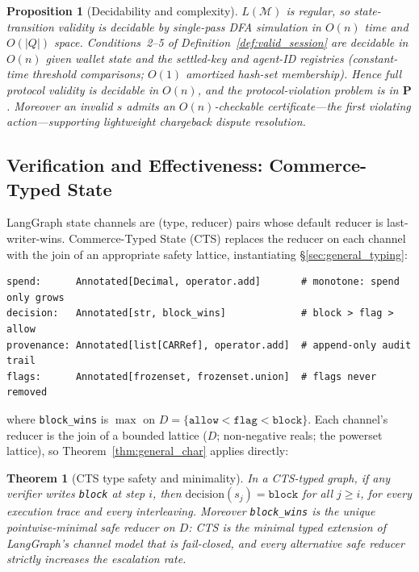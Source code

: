 \documentclass{article}
\newtheorem{proposition}{Proposition}
\newtheorem{theorem}{Theorem}
\begin{document}
\begin{proposition}[Decidability and complexity]
\label{prop:decidability}
$L(\mathcal{M})$ is regular, so state-transition validity is decidable by single-pass DFA
simulation in $O(n)$ time and $O(|Q|)$ space. Conditions~2--5 of
Definition~\ref{def:valid_session} are decidable in $O(n)$ given wallet state and the
settled-key and agent-ID registries (constant-time threshold comparisons; $O(1)$ amortized
hash-set membership). Hence full protocol validity is decidable in $O(n)$, and the
protocol-violation problem is in $\mathbf{P}$. Moreover an invalid $s$ admits an $O(n)$-checkable
certificate---the first violating action---supporting lightweight chargeback dispute resolution.
\end{proposition}

\subsection{Verification and Effectiveness: Commerce-Typed State}
\label{sec:cts}

LangGraph state channels are (type, reducer) pairs whose default reducer is
last-writer-wins. Commerce-Typed State (CTS) replaces the reducer on each channel with the
join of an appropriate safety lattice, instantiating \S\ref{sec:general_typing}:

\begin{lstlisting}
spend:      Annotated[Decimal, operator.add]       # monotone: spend only grows
decision:   Annotated[str, block_wins]             # block > flag > allow
provenance: Annotated[list[CARRef], operator.add]  # append-only audit trail
flags:      Annotated[frozenset, frozenset.union]  # flags never removed
\end{lstlisting}

\noindent where \texttt{block\_wins} is $\max$ on $D=\{\texttt{allow}<\texttt{flag}<\texttt{block}\}$.
Each channel's reducer is the join of a bounded lattice ($D$; non-negative reals; the
powerset lattice), so Theorem~\ref{thm:general_char} applies directly:

\begin{theorem}[CTS type safety and minimality]
\label{thm:type_safety}
\label{thm:char}
In a CTS-typed graph, if any verifier writes \texttt{block} at step $i$, then
$\mathrm{decision}(s_j)=\texttt{block}$ for all $j\ge i$, for every execution trace and every
interleaving. Moreover \texttt{block\_wins} is the unique pointwise-minimal safe reducer on
$D$: CTS is the \emph{minimal} typed extension of LangGraph's channel model that is
fail-closed, and every alternative safe reducer strictly increases the escalation rate.
\end{theorem}
\end{document}
